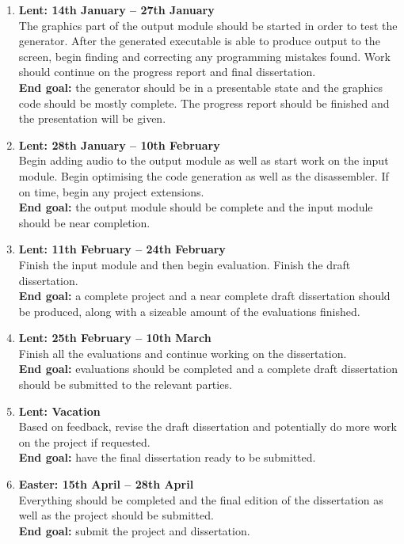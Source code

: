\documentclass[12pt,a4paper,twoside]{article}
\begin{document}
\begin{enumerate}
\item \textbf{Lent: 14th January -- 27th January} \\
The graphics part of the output module should be started in order to test the generator. After the generated executable is able to produce output to the screen, begin finding and correcting any programming mistakes found. Work should continue on the progress report and final dissertation. \\
\textbf{End goal:} the generator should be in a presentable state and the graphics code should be mostly complete. The progress report should be finished and the presentation will be given.

\item \textbf{Lent: 28th January -- 10th February} \\
Begin adding audio to the output module as well as start work on the input module. Begin optimising the code generation as well as the disassembler. If on time, begin any project extensions.\\
\textbf{End goal:} the output module should be complete and the input module should be near completion.

\item \textbf{Lent: 11th February -- 24th February}\\
Finish the input module and then begin evaluation. Finish the draft dissertation.\\
\textbf{End goal:} a complete project and a near complete draft dissertation should be produced, along with a sizeable amount of the evaluations finished.

\item \textbf{Lent: 25th February -- 10th March}\\
Finish all the evaluations and continue working on the dissertation.\\
\textbf{End goal:} evaluations should be completed and a complete draft dissertation should be submitted to the relevant parties.

\item \textbf{Lent: Vacation}\\
Based on feedback, revise the draft dissertation and potentially do more work on the project if requested.\\
\textbf{End goal:} have the final dissertation ready to be submitted.

\item \textbf{Easter: 15th April -- 28th April} \\
Everything should be completed and the final edition of the dissertation as well as the project should be submitted.\\
\textbf{End goal:} submit the project and dissertation.

\end{enumerate}
\end{document}

